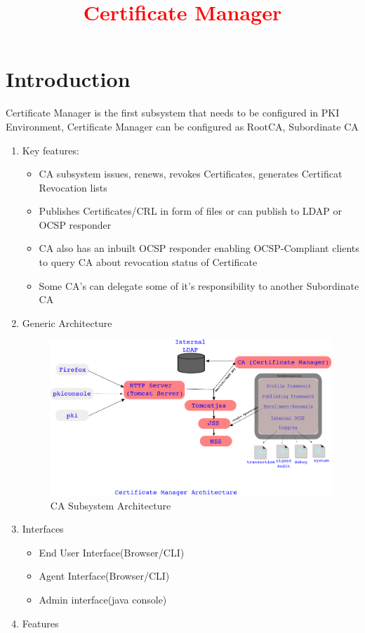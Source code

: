 \documentclass[a4paper, 8pt]{article}
\title{\textcolor{red}{Certificate Manager}}
\begin{document}
\maketitle
\tableofcontents
\section{Introduction}
Certificate Manager is the first subsystem that needs to be configured in PKI Environment, Certificate Manager can be configured as RootCA, Subordinate CA
\begin{enumerate}[label*=\arabic*.]
    \item Key features:
    \begin{itemize}
        \item CA subsystem issues, renews, revokes Certificates, generates Certificat Revocation lists
        \item Publishes Certificates/CRL in form of files or can publish to LDAP or OCSP responder
        \item CA also has an inbuilt OCSP responder enabling OCSP-Compliant clients to query CA about revocation status of Certificate
        \item Some CA's can delegate some of it's responsibility to another Subordinate CA
    \end{itemize}
\item Generic Architecture
    \begin{figure}[ht!]
        \centering
        \includegraphics[width=120mm]{CA-subsystem-Arch3.png}
        \caption{CA Subsystem Architecture}
    \end{figure}
\item Interfaces
    \begin{itemize}
        \item End User Interface(Browser/CLI)
        \item Agent Interface(Browser/CLI)
        \item Admin interface(java console)
    \end{itemize}
\item Features
\end{enumerate}
\end{document}

